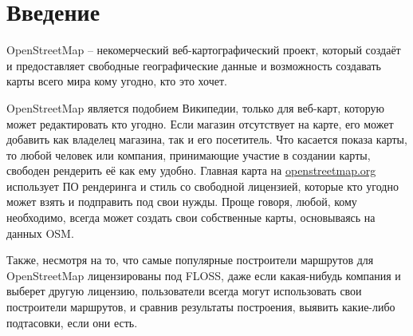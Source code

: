 \documentclass[a4paper, 14pt]{extreport}
\begin{document}
    \tableofcontents
    \onehalfspacing
    \chapter{Введение}
    OpenStreetMap -- некомерческий веб-картографический проект, который создаёт и предоставляет свободные 
    географические данные и возможность создавать карты всего мира кому угодно, кто это хочет.

    OpenStreetMap является подобием Википедии, только для веб-карт, которую может редактировать кто 
    угодно. Если магазин отсутствует на карте, его может добавить как владелец магазина, так и его 
    посетитель. Что касается показа карты, то любой человек или компания, принимающие участие в создании 
    карты, свободен рендерить её как ему удобно. Главная карта на \url{openstreetmap.org} использует 
    ПО рендеринга и стиль со свободной лицензией, которые кто угодно может взять и подправить под свои 
    нужды. Проще говоря, любой, кому необходимо, всегда может создать свои собственные карты, основываясь 
    на данных OSM.

    Также, несмотря на то, что самые популярные построители маршрутов для OpenStreetMap лицензированы под 
    FLOSS, даже если какая-нибудь компания и выберет другую лицензию, пользователи всегда могут использовать 
    свои построители маршрутов, и сравнив результаты построения, выявить какие-либо подтасовки, если они 
    есть.
\end{document}

